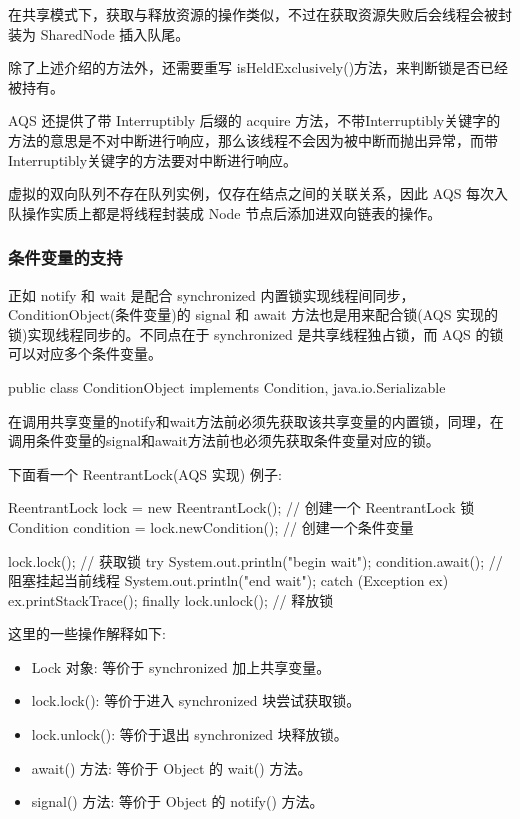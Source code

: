 在共享模式下，获取与释放资源的操作类似，不过在获取资源失败后会线程会被封装为 SharedNode 插入队尾。

除了上述介绍的方法外，还需要重写 isHeldExclusively()方法，来判断锁是否已经被持有。

AQS 还提供了带 Interruptibly 后缀的 acquire 方法，不带Interruptibly关键字的方法的意思是不对中断进行响应，那么该线程不会因为被中断而抛出异常，而带Interruptibly关键字的方法要对中断进行响应。

虚拟的双向队列不存在队列实例，仅存在结点之间的关联关系，因此 AQS 每次入队操作实质上都是将线程封装成 Node 节点后添加进双向链表的操作。

\subsubsection{条件变量的支持}

正如 notify 和 wait 是配合 synchronized 内置锁实现线程间同步，ConditionObject(条件变量)的 signal 和 await 方法也是用来配合锁(AQS 实现的锁)实现线程同步的。不同点在于 synchronized 是共享线程独占锁，而 AQS 的锁可以对应多个条件变量。

\begin{Java}
public class ConditionObject implements Condition, java.io.Serializable
\end{Java}

在调用共享变量的notify和wait方法前必须先获取该共享变量的内置锁，同理，在调用条件变量的signal和await方法前也必须先获取条件变量对应的锁。

下面看一个 ReentrantLock(AQS 实现) 例子:

\begin{Java}
ReentrantLock lock = new ReentrantLock();   // 创建一个 ReentrantLock 锁
Condition condition = lock.newCondition();  // 创建一个条件变量

lock.lock();    // 获取锁
try {
    System.out.println("begin wait");
    condition.await();      // 阻塞挂起当前线程
    System.out.println("end wait");
} catch (Exception ex) {
    ex.printStackTrace();
} finally {
    lock.unlock();      // 释放锁
}
\end{Java}

这里的一些操作解释如下:
\begin{itemize}
    \item Lock 对象: 等价于 synchronized 加上共享变量。
    \item lock.lock(): 等价于进入 synchronized 块尝试获取锁。
    \item lock.unlock(): 等价于退出 synchronized 块释放锁。
    \item await() 方法: 等价于 Object 的 wait() 方法。
    \item signal() 方法: 等价于 Object 的 notify() 方法。
\end{itemize}

